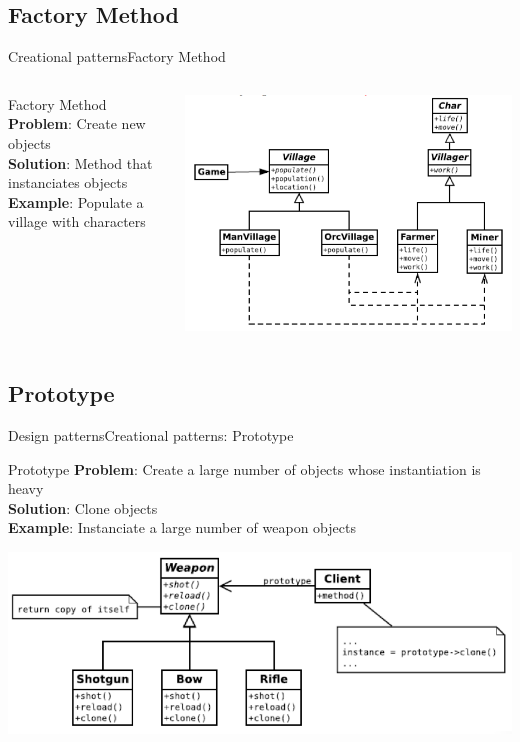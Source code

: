 \documentclass[10pt,compress]{beamer} %
\begin{document}
\subsection[Factory Method]{Factory Method}
\begin{frame}{Creational patterns}{Factory Method}
    \begin{columns}
	   \begin{block}{Factory Method}
			\textbf{Problem}: Create new objects\\
			\textbf{Solution}: Method that instanciates objects\\
			\textbf{Example}: Populate a village with characters\\
		\end{block}
		\centering\includegraphics[width=\linewidth]{figs/factorymethod}\\
	\end{columns}
\end{frame}

\subsection[Prototype]{Prototype}
\begin{frame}{Design patterns}{Creational patterns: Prototype}
	   \begin{block}{Prototype}
			\textbf{Problem}: Create a large number of objects whose instantiation is heavy\\
			\textbf{Solution}: Clone objects\\
			\textbf{Example}: Instanciate a large number of weapon objects\\
		\end{block}
		\centering\includegraphics[width=0.9\linewidth]{figs/prototype}\\
\end{frame}
\end{document}
